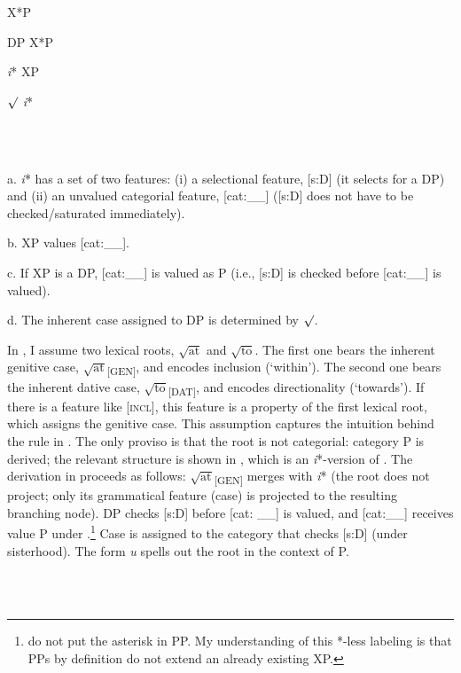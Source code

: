\documentclass[output=paper,modfonts,nonflat]{langsci/langscibook}
\begin{document}
          X*P

  DP  X*P

  \textit{i}*  XP

   ${\surd}$   \textit{i}*

\ea%
    \label{ex:key:16}
    \gll\\
        \\
    \glt
    \z

          a.  \textit{i}* has a set of two features: (i) a selectional feature, [s:D] (it selects for a DP) and (ii) an unvalued categorial feature, [cat:\_\_] ([s:D] does not have to be checked/saturated immediately). 

  b.  XP values [cat:\_\_]. 

  c.  If XP is a DP, [cat:\_\_] is valued as P (i.e., [s:D] is checked before [cat:\_\_] is valued).

  d.  The inherent case assigned to DP is determined by  ${\surd}$.

In \citet{Tsedryk2019}, I assume two lexical roots,  $\sqrt{\text{at}}$  and  $\sqrt{\text{to}}$. The first one bears the inherent genitive case,  $\sqrt{\text{at}}$\textsubscript{[GEN]}, and encodes inclusion (‘within’). The second one bears the inherent dative case,  $\sqrt{\text{to}}$\textsubscript{[DAT]}, and encodes directionality (‘towards’). If there is a feature like [\textsc{incl}], this feature is a property of the first lexical root, which assigns the genitive case. This assumption captures the intuition behind the rule in . The only proviso is that the root is not categorial: category P is derived; the relevant structure is shown in , which is an \textit{i}*-version of . The derivation in  proceeds as follows:  $\sqrt{\text{at}}$\textsubscript{[GEN]} merges with \textit{i}* (the root does not project; only its grammatical feature (case) is projected to the resulting branching node). DP checks [s:D] before [cat: \_\_] is valued, and [cat:\_\_] receives value P under .\footnote{\citet{WoodMarantz2017} do not put the asterisk in PP. My understanding of this *-less labeling is that PPs by definition do not extend an already existing XP.}  Case is assigned to the category that checks [s:D] (under sisterhood). The form \textit{u} spells out the root in the context of P.

\ea%
    \label{ex:key:17}
    \gll\\
        \\
    \glt
    \z
\end{document}
